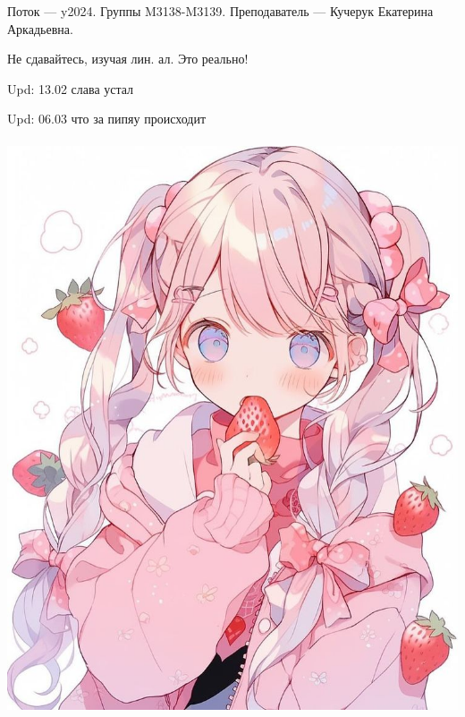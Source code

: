 Поток — y2024.\newline
Группы M3138-M3139.\newline
Преподаватель --- Кучерук Екатерина Аркадьевна.\par

Не сдавайтесь, изучая лин. ал. Это реально!

Upd: 13.02 слава устал

Upd: 06.03 что за пипяу происходит 
\begin{center}
   \includegraphics[height=17cm]{assets/cutegirl.jpg}
\end{center}